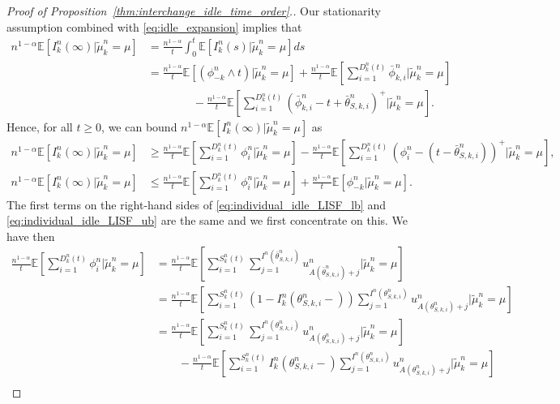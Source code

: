 \documentclass[a4paper,11pt,twoside]{article}
\numberwithin{equation}{section}
\numberwithin{figure}{section}
\theoremstyle{plain}
\newcommand{\EE}{\mathbb{E}}
\newcommand{\1}{\mathbbm{1}}
\begin{document}
\begin{proof}[Proof of Proposition~\ref{thm:interchange_idle_time_order}.]
Our stationarity assumption combined with \eqref{eq:idle_expansion} implies that
\begin{align*}
    n^{1-\alpha}\EE[I_k^n(\infty)|\tilde{\mu}_k^n=\mu]&=\frac{n^{1-\alpha}}{t}\int_0^t\EE[I_k^n(s)|\tilde{\mu}_k^n=\mu]ds\\
    &=\frac{n^{1-\alpha}}{t}\EE[(\phi_{-k}^n\wedge t)|\tilde{\mu}_k^n=\mu]+\frac{n^{1-\alpha}}{t}\EE\left[\sum_{i=1}^{D_k^n(t)}\bar{\phi}_{k,i}^n|\tilde{\mu}_k^n=\mu\right]\\
    &\qquad \qquad-\frac{n^{1-\alpha}}{t}\EE\left[\sum_{i=1}^{D_k^n(t)}(\bar{\phi}_{k,i}^n - t+\bar{\theta}_{S,k,i}^n)^+|\tilde{\mu}_k^n=\mu\right].
\end{align*}
Hence, for all $t\geq 0$, we can bound $n^{1-\alpha}\EE[I_k^n(\infty)|\tilde{\mu}_k^n=\mu]$ as
\begin{align}
    \label{eq:individual_idle_LISF_lb}n^{1-\alpha}\EE[I_k^n(\infty)|\tilde{\mu}_k^n=\mu]&\geq \frac{n^{1-\alpha}}{t}\EE\left[\sum_{i=1}^{D_k^n(t)}\phi_i^n|\tilde{\mu}_k^n=\mu\right]-\frac{n^{1-\alpha}}{t}\EE\left[\sum_{i=1}^{D_k^n(t)}(\phi_i^n-(t-\bar{\theta}_{S,k,i}^n))^+|\tilde{\mu}_k^n=\mu\right],
    \\
    \label{eq:individual_idle_LISF_ub}n^{1-\alpha}\EE[I_k^n(\infty)|\tilde{\mu}_k^n=\mu]&\leq\frac{n^{1-\alpha}}{t}\EE\left[\sum_{i=1}^{D_k^n(t)}\phi_i^n|\tilde{\mu}_k^n=\mu\right] + \frac{n^{1-\alpha}}{t}\EE[\phi_{-k}^n|\tilde{\mu}_k^n=\mu].
\end{align}
 The first terms on the right-hand sides of \eqref{eq:individual_idle_LISF_lb} and \eqref{eq:individual_idle_LISF_ub} are the same and we first concentrate on this. We have then 
 \begin{align*}
 \frac{n^{1-\alpha}}{t}\EE\left[\sum_{i=1}^{D_k^n(t)}\phi_i^n|\tilde{\mu}_k^n=\mu\right] &= \frac{n^{1-\alpha}}{t}\EE\left[\sum_{i=1}^{S_k^n(t)}\sum_{j=1}^{I^n(\bar{\theta}_{S,k,i}^n)}u_{A(\bar{\theta}_{S,k,i}^n)+j}^n|\tilde{\mu}_k^n=\mu\right]\\
 &= \frac{n^{1-\alpha}}{t}\EE\left[\sum_{i=1}^{S_k^n(t)}(1-I_k^n(\theta_{S,k,i}^n-))\sum_{j=1}^{I^n(\theta_{S,k,i}^n)}u_{A(\theta_{S,k,i}^n)+j}^n|\tilde{\mu}_k^n=\mu\right]\\
 &=\frac{n^{1-\alpha}}{t}\EE\left[\sum_{i=1}^{S_k^n(t)}\sum_{j=1}^{I^n(\theta_{S,k,i}^n)}u_{A(\theta_{S,k,i}^n)+j}^n|\tilde{\mu}_k^n=\mu\right]\\&\qquad-\frac{n^{1-\alpha}}{t}\EE\left[\sum_{i=1}^{S_k^n(t)}I_k^n(\theta_{S,k,i}^n-)\sum_{j=1}^{I^n(\theta_{S,k,i}^n)}u_{A(\theta_{S,k,i}^n)+j}^n|\tilde{\mu}_k^n=\mu\right]\\

\end{align*}
\end{proof}
\end{document}
